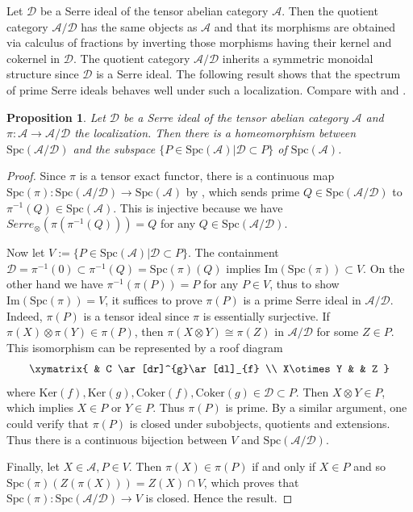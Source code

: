 \documentclass[11pt,a4paper]{amsart}
\numberwithin{equation}{section} \theoremstyle{plain}
\newtheorem{prop}[lem]{Proposition}
\begin{document}
Let $\mathcal{D}$ be a Serre ideal of the tensor abelian category $\mathcal{A}$. Then the quotient category $\mathcal{A}/\mathcal{D}$ has the same objects as $\mathcal{A}$ and that its morphisms are obtained via calculus of fractions by inverting those morphisms having their kernel and cokernel in $\mathcal{D}$.  The quotient category $\mathcal{A}/\mathcal{D}$ inherits a symmetric monoidal structure since $\mathcal{D}$ is a Serre ideal. The following result shows that the spectrum of prime Serre ideals behaves well under such a localization. Compare with \cite[Proposition 3.11]{Bal05} and \cite[Lemma 6.10]{B26}.
\begin{prop}\label{prop3.7}Let $\mathcal{D}$ be a Serre ideal of the tensor abelian category $\mathcal{A}$ and $\pi: \mathcal{A}\rightarrow \mathcal{A}/\mathcal{D}$  the localization. Then there is a homeomorphism between $\mathrm{Spc}(\mathcal{A}/\mathcal{D})$ and the subspace $\{P\in \mathrm{Spc}(\mathcal{A})| \mathcal{D}\subset P\}$ of $\mathrm{Spc}(\mathcal{A})$.
\end{prop}
\begin{proof} Since $\pi$ is a tensor exact functor, there is a continuous map $\mathrm{Spc}(\pi): \mathrm{Spc}(\mathcal{A}/\mathcal{D})\rightarrow \mathrm{Spc}(\mathcal{A})$ by \cite[Lemma 8.2]{BKS}, which sends prime $Q\in \mathrm{Spc}(\mathcal{A}/\mathcal{D})$ to $\pi^{-1}(Q)\in \mathrm{Spc}(\mathcal{A})$. This is injective because we have $Serre_{\otimes}(\pi(\pi^{-1}(Q)))=Q$ for any $Q\in \mathrm{Spc}(\mathcal{A}/\mathcal{D})$.

Now let $V:=\{P\in \mathrm{Spc}(\mathcal{A})| \mathcal{D}\subset P\}$. The containment $\mathcal{D}=\pi^{-1}(0)\subset \pi^{-1}(Q)=\mathrm{Spc}(\pi)(Q)$ implies $\mathrm{Im}(\mathrm{Spc}(\pi))\subset V$. On the other hand we have $\pi^{-1}(\pi(P))=P$ for any $P\in V$, thus to show $\mathrm{Im}(\mathrm{Spc}(\pi))=V$, it suffices to prove $\pi(P)$ is a prime Serre ideal in $\mathcal{A}/\mathcal{D}$. Indeed, $\pi(P)$ is a tensor ideal since $\pi$ is essentially surjective.  If $\pi(X)\otimes \pi(Y)\in \pi(P)$, then $\pi(X\otimes Y)\cong \pi(Z)$ in $\mathcal{A}/\mathcal{D}$ for some $Z\in P$. This isomorphism can be represented by a roof diagram $$\xymatrix{
                & C \ar[dr]^{g}\ar[dl]_{f}             \\
 X\otimes Y  & &     Z       }
 $$
where $\mathrm{Ker}(f),\mathrm{Ker}(g),\mathrm{Coker}(f),\mathrm{Coker}(g)\in \mathcal{D}\subset P$. Then $X\otimes Y\in P$, which implies $X\in P$ or $Y\in P$. Thus $\pi(P)$ is prime. By a similar argument, one could verify that $\pi(P)$ is closed under subobjects, quotients and extensions. Thus there is a continuous bijection between $V$ and $\mathrm{Spc}(\mathcal{A}/\mathcal{D})$.

Finally, let $X\in \mathcal{A}, P\in V$. Then $\pi(X)\in \pi(P)$ if and only if $X\in P$ and so $\mathrm{Spc}(\pi)(Z(\pi(X)))=Z(X)\cap V$, which proves that $\mathrm{Spc}(\pi): \mathrm{Spc}(\mathcal{A}/\mathcal{D})\rightarrow V$ is closed. Hence the result.
\end{proof}
\end{document}
